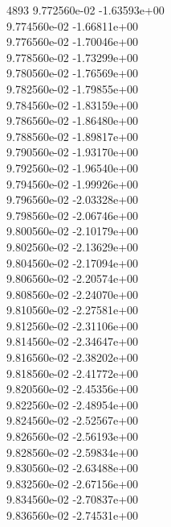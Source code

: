 4893	9.772560e-02	-1.63593e+00	\\ 	9.774560e-02	-1.66811e+00	\\ 	9.776560e-02	-1.70046e+00	\\ 	9.778560e-02	-1.73299e+00	\\ 	9.780560e-02	-1.76569e+00	\\ 	9.782560e-02	-1.79855e+00	\\ 	9.784560e-02	-1.83159e+00	\\ 	9.786560e-02	-1.86480e+00	\\ 	9.788560e-02	-1.89817e+00	\\ 	9.790560e-02	-1.93170e+00	\\ 	9.792560e-02	-1.96540e+00	\\ 	9.794560e-02	-1.99926e+00	\\ 	9.796560e-02	-2.03328e+00	\\ 	9.798560e-02	-2.06746e+00	\\ 	9.800560e-02	-2.10179e+00	\\ 	9.802560e-02	-2.13629e+00	\\ 	9.804560e-02	-2.17094e+00	\\ 	9.806560e-02	-2.20574e+00	\\ 	9.808560e-02	-2.24070e+00	\\ 	9.810560e-02	-2.27581e+00	\\ 	9.812560e-02	-2.31106e+00	\\ 	9.814560e-02	-2.34647e+00	\\ 	9.816560e-02	-2.38202e+00	\\ 	9.818560e-02	-2.41772e+00	\\ 	9.820560e-02	-2.45356e+00	\\ 	9.822560e-02	-2.48954e+00	\\ 	9.824560e-02	-2.52567e+00	\\ 	9.826560e-02	-2.56193e+00	\\ 	9.828560e-02	-2.59834e+00	\\ 	9.830560e-02	-2.63488e+00	\\ 	9.832560e-02	-2.67156e+00	\\ 	9.834560e-02	-2.70837e+00	\\ 	9.836560e-02	-2.74531e+00	\\ \hline
